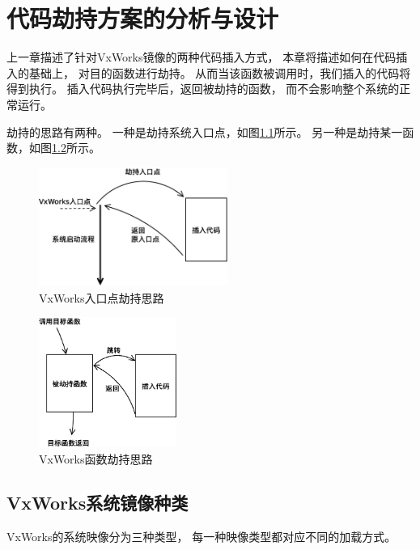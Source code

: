 \chapter{代码劫持方案的分析与设计}

上一章描述了针对VxWorks镜像的两种代码插入方式，
本章将描述如何在代码插入的基础上，
对目的函数进行劫持。
从而当该函数被调用时，我们插入的代码将得到执行。
插入代码执行完毕后，返回被劫持的函数，
而不会影响整个系统的正常运行。

劫持的思路有两种。
一种是劫持系统入口点，如图\ref{hijack1}所示。
另一种是劫持某一函数，如图\ref{hijack2}所示。

\begin{figure}[h!]
    \centering
    \includegraphics[width=0.55\textwidth]{figure/hijack1.eps}
    \caption{VxWorks入口点劫持思路}
    \label{hijack1}
\end{figure}

\begin{figure}[h!]
    \centering
    \includegraphics[width=0.4\textwidth]{figure/hijack2.eps}
    \caption{VxWorks函数劫持思路}
    \label{hijack2}
\end{figure}


\section{VxWorks系统镜像种类}

VxWorks的系统映像分为三种类型，
每一种映像类型都对应不同的加载方式。

